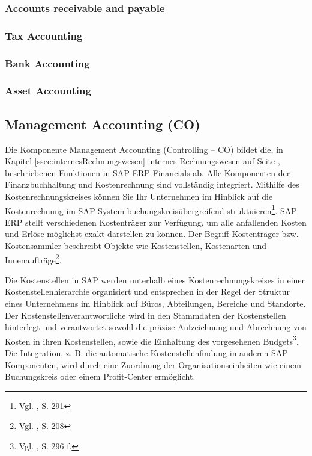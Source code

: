 \subsubsection{Accounts receivable and payable} %
\subsubsection{Tax Accounting} %

\subsubsection{Bank Accounting} %
\subsubsection{Asset Accounting} %

\subsection{Management Accounting (CO)} %
Die Komponente Management Accounting (Controlling -- CO) bildet die, in Kapitel \ref{ssec:internesRechnungswesen} internes Rechnungswesen auf Seite \pageref{ssec:internesRechnungswesen}, beschriebenen Funktionen in SAP ERP Financials ab. Alle Komponenten der Finanzbuchhaltung und Kostenrechnung sind vollständig integriert. Mithilfe des Kostenrechnungskreises können Sie Ihr Unternehmen im Hinblick auf die Kostenrechnung im SAP-System buchungskreisübergreifend struktuieren\footnote{Vgl. \cite{Patel2009}, S. 291}. SAP ERP stellt verschiedenen Kostenträger zur Verfügung, um alle anfallenden Kosten und Erlöse möglichst exakt darstellen zu können. Der Begriff Kostenträger bzw. Kostensammler beschreibt Objekte wie Kostenstellen, Kostenarten und Innenaufträge\footnote{Vgl. \cite{Patel2009}, S. 208}. 

Die Kostenstellen in SAP werden unterhalb eines Kostenrechnungskreises in einer Kostenstellenhierarchie organisiert und entsprechen in der Regel der Struktur eines Unternehmens im Hinblick auf Büros, Abteilungen, Bereiche und Standorte. Der Kostenstellenverantwortliche wird in den Stammdaten der Kostenstellen hinterlegt und verantwortet sowohl die präzise Aufzeichnung und Abrechnung von Kosten in ihren Kostenstellen, sowie die Einhaltung des vorgesehenen Budgets\footnote{Vgl. \cite{Patel2009}, S. 296 f.}. Die Integration, z. B. die automatische Kostenstellenfindung in anderen SAP Komponenten, wird durch eine Zuordnung der Organisationseinheiten wie einem Buchungskreis oder einem Profit-Center ermöglicht.

